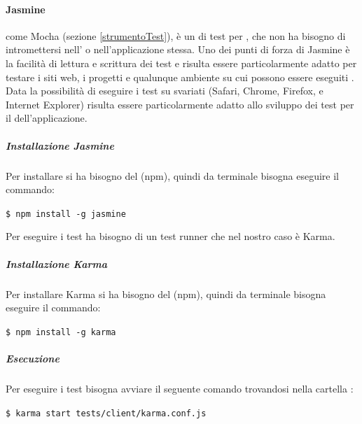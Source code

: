 \documentclass[12pt,a4paper]{article}
\begin{document}
\paragraph{Jasmine} \label{jasmine}
come Mocha (sezione \ref{strumentoTest}), è un  di test per , che non ha bisogno di intromettersi nell' o nell'applicazione stessa. Uno dei punti di forza di Jasmine è la facilità di lettura e scrittura dei test e risulta essere particolarmente adatto per testare i siti web, i progetti  e qualunque ambiente su cui possono essere eseguiti . Data la possibilità di eseguire i test su svariati  (Safari, Chrome, Firefox, e Internet Explorer) risulta essere particolarmente adatto allo sviluppo dei test per il  dell'applicazione.
\subparagraph{Installazione Jasmine}
Per installare  si ha bisogno del  (npm), quindi da terminale bisogna eseguire il commando:
\begin{center}
	\texttt{\$ npm install -g jasmine}  
\end{center}
Per eseguire i test  ha bisogno di un test runner che nel nostro caso è Karma.
\subparagraph{Installazione Karma}
Per installare Karma si ha bisogno del  (npm), quindi da terminale bisogna eseguire il commando:
\begin{center}
	\texttt{\$ npm install -g karma}  
\end{center}
\subparagraph{Esecuzione}
Per eseguire i test bisogna avviare il seguente comando trovandosi nella cartella :
\begin{center}
\texttt{\$ karma start tests/client/karma.conf.js}  
\end{center}
\end{document}

